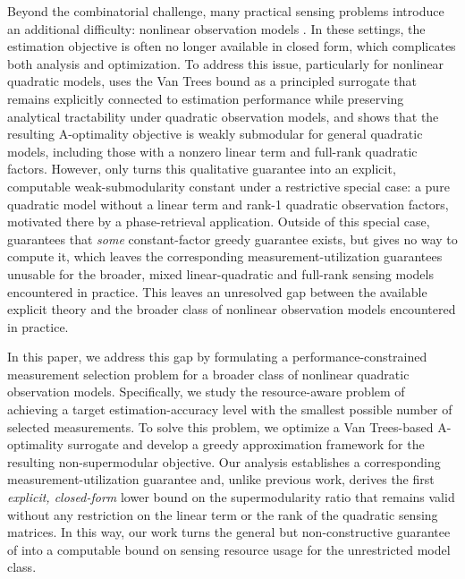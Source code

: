 \documentclass[letterpaper, 10 pt, conference]{ieeeconf}  %
\begin{document}
Beyond the combinatorial challenge, many practical sensing problems introduce an additional difficulty: nonlinear observation models \cite{c17,c18}. In these settings, the estimation objective is often no longer available in closed form, which complicates both analysis and optimization. To address this issue, particularly for nonlinear quadratic models, \cite{c19} uses the Van Trees bound as a principled surrogate that remains explicitly connected to estimation performance while preserving analytical tractability under quadratic observation models, and shows that the resulting A-optimality objective is weakly submodular for general quadratic models, including those with a nonzero linear term and full-rank quadratic factors. However, \cite{c19} only turns this qualitative guarantee into an explicit, computable weak-submodularity constant under a restrictive special case: a pure quadratic model without a linear term and rank-1 quadratic observation factors, motivated there by a phase-retrieval application. Outside of this special case, \cite{c19} guarantees that \emph{some} constant-factor greedy guarantee exists, but gives no way to compute it, which leaves the corresponding measurement-utilization guarantees unusable for the broader, mixed linear-quadratic and full-rank sensing models encountered in practice. This leaves an unresolved gap between the available explicit theory and the broader class of nonlinear observation models encountered in practice.

In this paper, we address this gap by formulating a performance-constrained measurement selection problem for a broader class of nonlinear quadratic observation models. Specifically, we study the resource-aware problem of achieving a target estimation-accuracy level with the smallest possible number of selected measurements. To solve this problem, we optimize a Van Trees-based A-optimality surrogate and develop a greedy approximation framework for the resulting non-supermodular objective. Our analysis establishes a corresponding measurement-utilization guarantee and, unlike previous work, derives the first \emph{explicit, closed-form} lower bound on the supermodularity ratio that remains valid without any restriction on the linear term or the rank of the quadratic sensing matrices. In this way, our work turns the general but non-constructive guarantee of \cite{c19} into a computable bound on sensing resource usage for the unrestricted model class.
\end{document}
